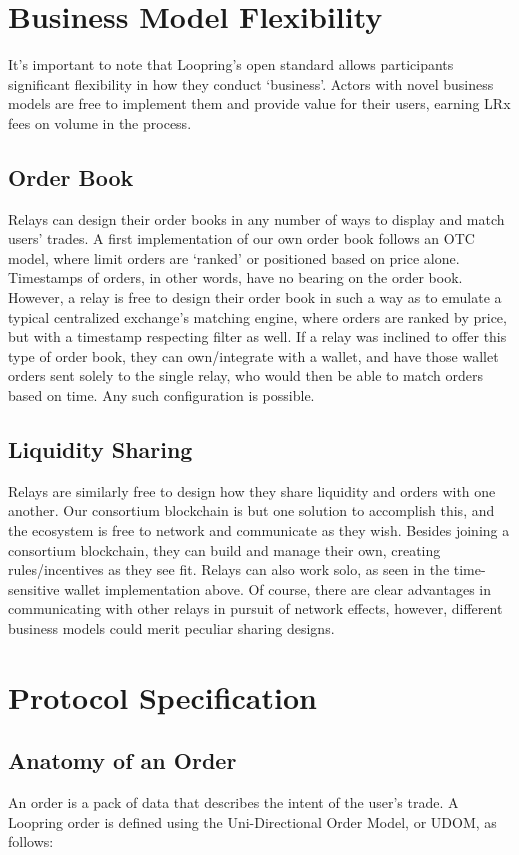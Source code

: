 \documentclass[UTF8,nofonts]{article}
\begin{document}
\section{Business Model Flexibility}
It's important to note that Loopring's open standard allows participants significant flexibility in how they conduct ‘business'. Actors with novel business models are free to implement them and provide value for their users, earning LRx fees on volume in the process.
\subsection{Order Book}
Relays can design their order books in any number of ways to display and match users' trades. A first implementation of our own order book follows an OTC model, where limit orders are ‘ranked' or positioned based on price alone. Timestamps of orders, in other words, have no bearing on the order book. However, a relay is free to design their order book in such a way as to emulate a typical centralized exchange's matching engine, where orders are ranked by price, but with a timestamp respecting filter as well. If a relay was inclined to offer this type of order book, they can own/integrate with a wallet, and have those wallet orders sent solely to the single relay, who would then be able to match orders based on time. Any such configuration is possible. 

\subsection{Liquidity Sharing}
Relays are similarly free to design how they share liquidity and orders with one another. Our consortium blockchain is but one solution to accomplish this, and the ecosystem is free to network and communicate as they wish. Besides joining a consortium blockchain, they can build and manage their own, creating rules/incentives as they see fit. Relays can also work solo, as seen in the time-sensitive wallet implementation above. Of course, there are clear advantages in communicating with other relays in pursuit of network effects, however, different business models could merit peculiar sharing designs. 



\section{Protocol Specification}

\subsection{Anatomy of an Order\label{anatomy}}
An order is a pack of data that describes the intent of the user's trade. A Loopring order is defined using the Uni-Directional Order Model, or UDOM, as follows:
\end{document}
